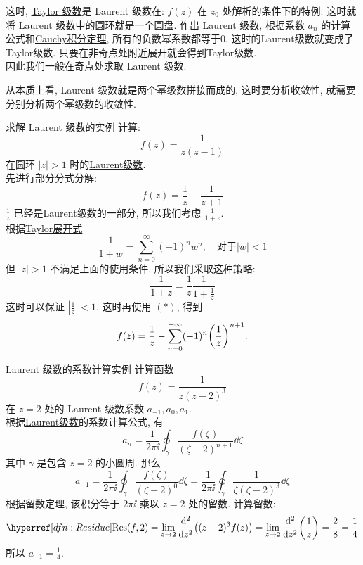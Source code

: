         \begin{rmk}
            [Dedicatia]
            这时, \hyperref[thm:Taylor]{Taylor 级数}是 Laurent 级数在: \(f(z)\) 在 \(z_0\) 处解析的条件下的特例: 这时就将 Laurent 级数中的圆环就是一个圆盘. 作出 Laurent 级数, 根据系数 \(a_n\) 的计算公式和\hyperref[thm:Cauchy-Integral]{Cauchy积分定理}, 所有的负数幂系数都等于0. 这时的Laurent级数就变成了Taylor级数. 只要在非奇点处附近展开就会得到Taylor级数. \\
            因此我们一般在奇点处求取 Laurent 级数. 
        \end{rmk}

        \begin{rmk}
            [Dedicatia]
            从本质上看, Laurent 级数就是两个幂级数拼接而成的, 这时要分析收敛性, 就需要分别分析两个幂级数的收敛性.
        \end{rmk}
        
        \begin{xmp}
            {求解 Laurent 级数的实例}
            计算: 
            \[f(z)=\frac{1}{z(z-1)}\]
            在圆环 \(|z|>1\) 时的\hyperref[thm:Laurent-Series]{Laurent级数}.\\
            先进行部分分式分解: 
            \[f(z)=\frac{1}{z}-\frac{1}{z+1}\]
            \(\frac{1}{z}\) 已经是Laurent级数的一部分, 所以我们考虑 \(\frac{1}{1+z}\).\\
            根据\hyperref[xmp:Taylor-Common]{Taylor展开式}
            \[\frac{1}{1 + w} = \sum_{n=0}^{\infty} (-1)^n w^n, \quad \text{对于} |w| < 1\tag{\(\ast\)}\]
            但 \(|z|>1\) 不满足上面的使用条件, 所以我们采取这种策略: 
            \[\frac{1}{1+z}=\frac{1}{z}\frac{1}{1+\frac{1}{z}}\]
            这时可以保证 \(\left\lvert \frac{1}{z}\right\rvert <1\). 这时再使用 \((\ast)\), 得到
            \[f(z)=\frac{1}{z}-\sum_{n=0}^{+\infty}(-1)^n\qty(\frac{1}{z})^{n+1}.\]
        \end{xmp}

        \begin{xmp}
            {Laurent 级数的系数计算实例}
            计算函数
            \[f(z)=\frac{1}{z(z-2)^3}\]
            在 \(z=2\) 处的 Laurent 级数系数 \(a_{-1},a_{0},a_{1}\).\\
            根据\hyperref[thm:Laurent-Series]{Laurent级数}的系数计算公式, 有
            \[a_n=\frac{1}{2\pi\ii}\oint_{\gamma}\frac{f(\zeta)}{(\zeta-2)^{n+1}}\dd{\zeta}\]
            其中 \(\gamma\) 是包含 \(z=2\) 的小圆周. 那么
            \[a_{-1}=\frac{1}{2\pi\ii}\oint_{\gamma}\frac{f(\zeta)}{(\zeta-2)^{0}}\dd{\zeta}=\frac{1}{2\pi\ii}\oint_{\gamma}\frac{1}{\zeta(\zeta-2)^3}\dd{\zeta}\]
            根据留数定理, 该积分等于 \(2\pi\ii\) 乘以 \(z=2\) 处的留数. 计算留数:
            \[\Res(f,2)=\lim_{z\to 2}\dv[2]{z}((z-2)^3f(z))=\lim_{z\to 2}\dv[2]{z}(\frac{1}{z})=\frac{2}{8}=\frac{1}{4}\]
            所以 \(a_{-1}=\frac{1}{4}\).
        \end{xmp}

